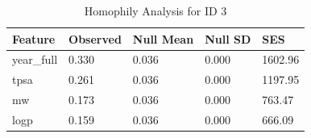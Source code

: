 \begin{table}
\caption{Homophily Analysis for ID 3}
\label{tab:homophily_id3}
\begin{tabular}{lllll}
\toprule
Feature & Observed & Null Mean & Null SD & SES \\
\midrule
year_full & 0.330 & 0.036 & 0.000 & 1602.96 \\
tpsa & 0.261 & 0.036 & 0.000 & 1197.95 \\
mw & 0.173 & 0.036 & 0.000 & 763.47 \\
logp & 0.159 & 0.036 & 0.000 & 666.09 \\
\bottomrule
\end{tabular}
\end{table}
